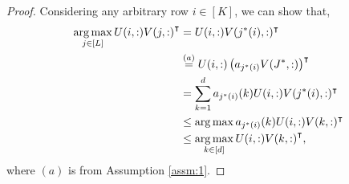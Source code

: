 \begin{proof}
Considering any arbitrary row $i\in [K]$, we can show that,
\begin{align*}
\mathop{\rm arg\,max}_{j\in[L]} U(i,:){V(j,:)}^{\intercal}  &= U(i,:)V(j^*(i),:)^{\intercal}\\
& \overset{(a)}{=} U(i,:)\left(a_{j^*(i)}V(J^*,:)\right)^{\intercal}\\
& = \sum_{k=1}^{d}a_{j^*(i)}(k)U(i,:)V(j^*(i),:)^{\intercal}\\
& \leq \mathop{\rm arg\,max} a_{j^*(i)}(k)U(i,:)V(k,:)^{\intercal} \\
& \leq \mathop{\rm arg\,max}_{k\in[d]}U(i,:){V(k,:)}^{\intercal}   ,
\end{align*}
where $(a)$ is from Assumption \ref{assm:1}.
\end{proof}